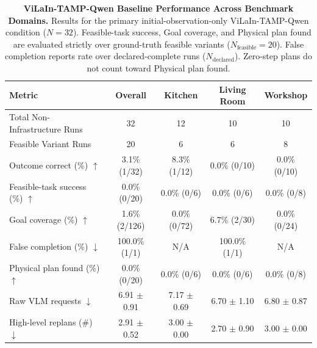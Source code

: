 \begin{table}[t]
\centering
\small
\caption{\textbf{ViLaIn-TAMP-Qwen Baseline Performance Across Benchmark Domains.}
Results for the primary initial-observation-only ViLaIn-TAMP-Qwen condition ($N=32$).
Feasible-task success, Goal coverage, and Physical plan found are evaluated strictly over ground-truth feasible variants ($N_{\text{feasible}}=20$).
False completion reports rate over declared-complete runs ($N_{\text{declared}}$). Zero-step plans do not count toward Physical plan found.}
\label{tab:vilain_qwen_main}
\begin{tabular}{l|c|ccc}
\hline
\textbf{Metric} & \textbf{Overall} & \textbf{Kitchen} & \textbf{Living Room} & \textbf{Workshop} \\
\hline
Total Non-Infrastructure Runs & 32 & 12 & 10 & 10 \\
Feasible Variant Runs & 20 & 6 & 6 & 8 \\
\hline
Outcome correct (\%) $\uparrow$ & 3.1\% (1/32) & 8.3\% (1/12) & 0.0\% (0/10) & 0.0\% (0/10) \\
Feasible-task success (\%) $\uparrow$ & 0.0\% (0/20) & 0.0\% (0/6) & 0.0\% (0/6) & 0.0\% (0/8) \\
Goal coverage (\%) $\uparrow$ & 1.6\% (2/126) & 0.0\% (0/72) & 6.7\% (2/30) & 0.0\% (0/24) \\
False completion (\%) $\downarrow$ & 100.0\% (1/1) & N/A & 100.0\% (1/1) & N/A \\
Physical plan found (\%) $\uparrow$ & 0.0\% (0/20) & 0.0\% (0/6) & 0.0\% (0/6) & 0.0\% (0/8) \\
Raw VLM requests $\downarrow$ & 6.91 $\pm$ 0.91 & 7.17 $\pm$ 0.69 & 6.70 $\pm$ 1.10 & 6.80 $\pm$ 0.87 \\
High-level replans (\#) $\downarrow$ & 2.91 $\pm$ 0.52 & 3.00 $\pm$ 0.00 & 2.70 $\pm$ 0.90 & 3.00 $\pm$ 0.00 \\
\hline
\end{tabular}
\end{table}
